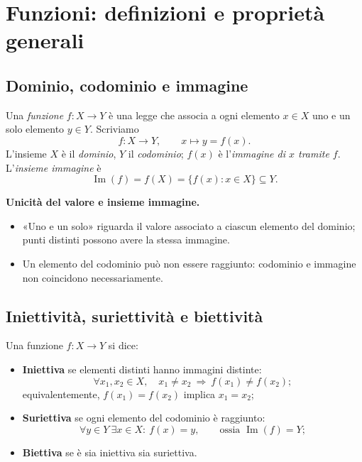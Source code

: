 \chapter{Funzioni: definizioni e proprietà generali}
\label{cap:funzioni}

\section{Dominio, codominio e immagine}

\begin{definizione}
Una \emph{funzione} $f\colon X\to Y$ è una legge che associa a ogni elemento $x\in X$ uno e un solo elemento $y\in Y$. Scriviamo
\[
f\colon X\longrightarrow Y,\qquad x\longmapsto y=f(x).
\]
L'insieme $X$ è il \emph{dominio}, $Y$ il \emph{codominio}; $f(x)$ è l'\emph{immagine di $x$ tramite $f$}. L'\emph{insieme immagine} è
\[
\operatorname{Im}(f)=f(X)=\{f(x):x\in X\}\subseteq Y.
\]
\end{definizione}

\textbf{Unicità del valore e insieme immagine.}
\begin{itemize}
  \item «Uno e un solo» riguarda il valore associato a ciascun elemento del dominio; punti distinti possono avere la stessa immagine.
  \item Un elemento del codominio può non essere raggiunto: codominio e immagine non coincidono necessariamente.
\end{itemize}

\section{Iniettività, suriettività e biettività}

\begin{definizione}
Una funzione $f\colon X\to Y$ si dice:
\begin{itemize}
  \item \textbf{Iniettiva} se elementi distinti hanno immagini distinte:
  \[
  \forall x_1,x_2\in X,\quad
  x_1\ne x_2\ \Longrightarrow\ f(x_1)\ne f(x_2);
  \]
equivalentemente, $f(x_1)=f(x_2)$ implica $x_1=x_2$;
  \item \textbf{Suriettiva} se ogni elemento del codominio è raggiunto:
  \[
  \forall y\in Y\ \exists x\in X:\ f(x)=y,
  \qquad\text{ossia }\operatorname{Im}(f)=Y;
  \]
  \item \textbf{Biettiva} se è sia iniettiva sia suriettiva.
\end{itemize}
\end{definizione}

